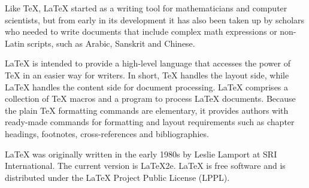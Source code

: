 {Like TeX, LaTeX started as a writing tool for mathematicians and computer scientists, but from early in its development it has also been taken up by scholars who needed to write documents that include complex math expressions or non-Latin scripts, such as Arabic, Sanskrit and Chinese.

LaTeX is intended to provide a high-level language that accesses the power of TeX in an easier way for writers. In short, TeX handles the layout side, while LaTeX handles the content side for document processing. LaTeX comprises a collection of TeX macros and a program to process LaTeX documents. Because the plain TeX formatting commands are elementary, it provides authors with ready-made commands for formatting and layout requirements such as chapter headings, footnotes, cross-references and bibliographies.

LaTeX was originally written in the early 1980s by Leslie Lamport at SRI International. The current version is LaTeX2e. LaTeX is free software and is distributed under the LaTeX Project Public License (LPPL).
}